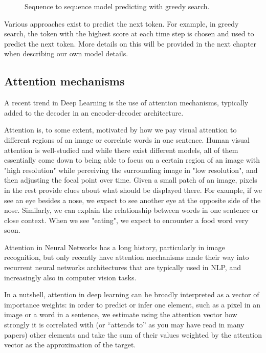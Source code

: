 \begin{figure}[hpt]
	\centering
	
	\caption{Sequence to sequence model predicting with greedy search.}
	\label{fig:seq2seq_predict}
\end{figure}

Various approaches exist to predict the next token. For example, in greedy search, the token with the highest score at each time step is chosen and used to predict the next token. More details on this will be provided in the next chapter when describing our own model details.

\subsection{Attention mechanisms}\label{sec:attention}

A recent trend in Deep Learning is the use of attention mechanisms, typically added to the decoder in an encoder-decoder architecture. 

Attention is, to some extent, motivated by how we pay visual attention to different regions of an image or correlate words in one sentence. Human visual attention is well-studied and while there exist different models, all of them essentially come down to being able to focus on a certain region of an image with "high resolution" while perceiving the surrounding image in "low resolution", and then adjusting the focal point over time. Given a small patch of an image, pixels in the rest provide clues about what should be displayed there. For example, if we see an eye besides a nose, we expect to see another eye at the opposite side of the nose. Similarly, we can explain the relationship between words in one sentence or close context. When we see "eating", we expect to encounter a food word very soon. 

Attention in Neural Networks has a long history, particularly in image recognition, but only recently have attention mechanisms made their way into recurrent neural networks architectures that are typically used in NLP, and increasingly also in computer vision tasks.

In a nutshell, attention in deep learning can be broadly interpreted as a vector of importance weights: in order to predict or infer one element, such as a pixel in an image or a word in a sentence, we estimate using the attention vector how strongly it is correlated with (or “attends to” as you may have read in many papers) other elements and take the sum of their values weighted by the attention vector as the approximation of the target.

